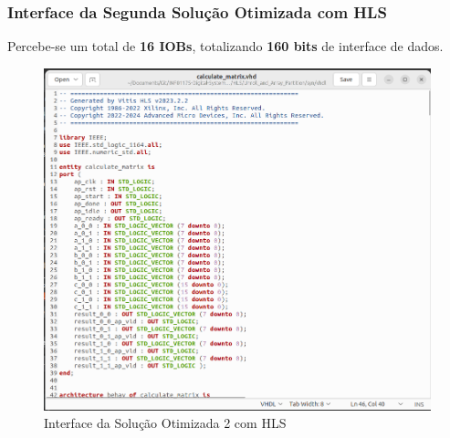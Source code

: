 \documentclass{beamer}
\begin{document}
    \begin{frame}
        \frametitle{Interface da Segunda Solução Otimizada com HLS}

        \begingroup {}
        Percebe-se um total de \textbf{16 IOBs}, totalizando
        \textbf{160 bits} de interface de dados.
        \endgroup

        \begin{figure}[h] 
            \centering
            \includegraphics[width=0.55\linewidth]{./images/solutions/VHDL_-_Unroll_and_Array_Partitioning.png}
            \caption{\label{img:int-hls-optimized-solution-2} Interface da Solução Otimizada 2 com HLS}
          \end{figure}
    \end{frame}
\end{document}
